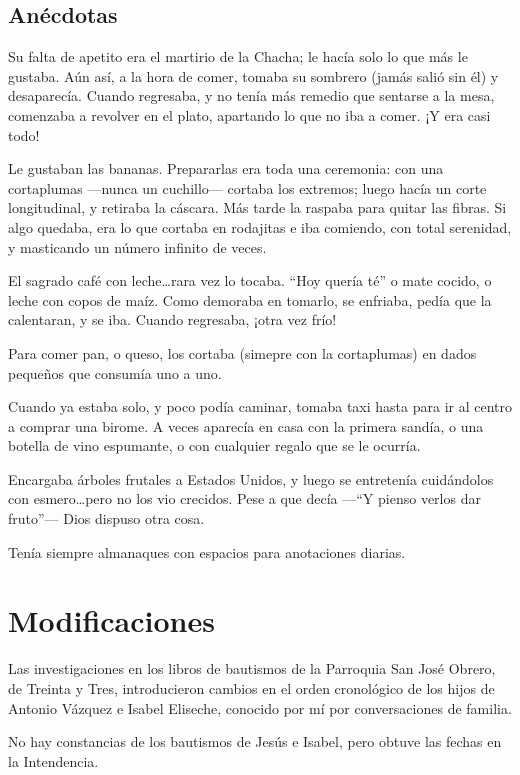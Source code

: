 \documentclass[a4paper]{article}
\begin{document}
\subsection{Anécdotas}

Su falta de apetito era el martirio de la Chacha; le hacía solo lo que más le gustaba. Aún así, a la hora de comer, tomaba su sombrero (jamás salió sin él) y desaparecía. Cuando regresaba, y no tenía más remedio que sentarse a la mesa, comenzaba a revolver en el plato, apartando lo que no iba a comer. ¡Y era casi todo!

Le gustaban las bananas. Prepararlas era toda una ceremonia: con una cortaplumas ---nunca un cuchillo--- cortaba los extremos; luego hacía un corte longitudinal, y retiraba la cáscara. Más tarde la raspaba para quitar las fibras. Si algo quedaba, era lo que cortaba en rodajitas e iba comiendo, con total serenidad, y masticando un número infinito de veces.

El sagrado café con leche\ldots rara vez lo tocaba. ``Hoy quería té'' o mate cocido, o leche con copos de maíz. Como demoraba en tomarlo, se enfriaba, pedía que la calentaran, y se iba. Cuando regresaba, ¡otra vez frío!

Para comer pan, o queso, los cortaba (simepre con la cortaplumas) en dados pequeños que consumía uno a uno.

Cuando ya estaba solo, y poco podía caminar, tomaba taxi hasta para ir al centro a comprar una birome. A veces aparecía en casa con la primera sandía, o una botella de vino espumante, o con cualquier regalo que se le ocurría.

Encargaba árboles frutales a Estados Unidos, y luego se entretenía cuidándolos con esmero\ldots pero no los vio crecidos. Pese a que decía ---``Y pienso verlos dar fruto''--- Dios dispuso otra cosa.

Tenía siempre almanaques con espacios para anotaciones diarias.

\section{Modificaciones}

Las investigaciones en los libros de bautismos de la Parroquia San José Obrero, de Treinta y Tres, introducieron cambios en el orden cronológico de los hijos de Antonio Vázquez e Isabel Eliseche, conocido por mí por conversaciones de familia.

No hay constancias de los bautismos de Jesús e Isabel, pero obtuve las fechas en la Intendencia.
\end{document}
